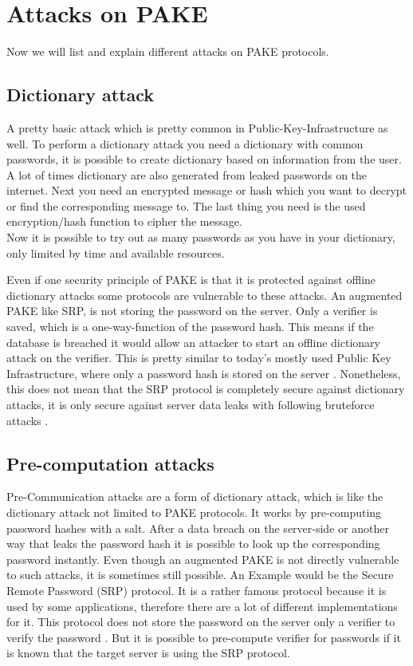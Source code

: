\documentclass[journal]{IEEEtran}
\begin{document}
\section{Attacks on PAKE}
Now we will list and explain different attacks on PAKE protocols. 
\subsection{Dictionary attack}
A pretty basic attack which is pretty common in Public-Key-Infrastructure as well. \cite{bovsnjak2018brute}
To perform a dictionary attack you need a dictionary with common passwords, it is possible to create dictionary based on information from the user. 
A lot of times dictionary are also generated from leaked passwords on the internet.
Next you need an encrypted message or hash which you want to decrypt or find the corresponding message to.
The last thing you need is the used encryption/hash function to cipher the message. \\
Now it is possible to try out as many passwords as you have in your dictionary, only limited by time and available resources. 

Even if one security principle of PAKE is that it is protected against offline dictionary attacks some protocols are vulnerable to these attacks.
An augmented PAKE like SRP, is not storing the password on the server. Only a verifier is saved, which is a one-way-function of the password hash. 
This means if the database is breached it would allow an attacker to start an offline dictionary attack on the verifier. 
This is pretty similar to today's mostly used Public Key Infrastructure, where only a password hash is stored on the server \cite{sherman2020formal}.
Nonetheless, this does not mean that the SRP protocol is completely secure against dictionary attacks, it is only secure against server data leaks with following bruteforce attacks \cite{de2021parasite}. 

\subsection{Pre-computation attacks}
Pre-Communication attacks are a form of dictionary attack, which is like the dictionary attack not limited to PAKE protocols. 
It works by pre-computing password hashes with a salt. After a data breach on the server-side or another way that leaks the password hash it is possible to look up the corresponding password instantly.
Even though an augmented PAKE is not directly vulnerable to such attacks, it is sometimes still possible.
An Example would be the Secure  Remote Password (SRP) protocol. It is a rather famous protocol because it is used by some applications, therefore there are a lot of different implementations for it. %
This protocol does not store the password on the server only a verifier to verify the password \cite{sherman2020formal}. 
But it is possible to pre-compute verifier for passwords if it is known that the target server is using the SRP protocol. \cite{de2021parasite}
\end{document}
